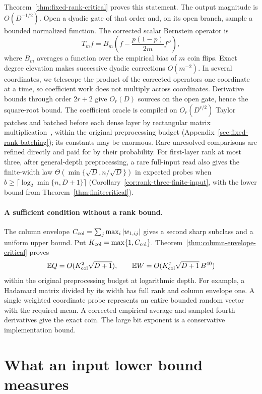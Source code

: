 \documentclass[11pt]{article}
\theoremstyle{definition}
\theoremstyle{remark}
\newcommand{\E}{\mathbb E}
\numberwithin{equation}{section}
\begin{document}
Theorem~\ref{thm:fixed-rank-critical} proves this statement.
The output magnitude is $O(D^{-1/2})$. Open a dyadic gate of
that order and, on its open branch, sample a bounded normalized
function. The corrected scalar Bernstein operator is
\[
 T_m f=B_m\left(f-\frac{p(1-p)}{2m}f''\right),
\]
where $B_m$ averages a function over the empirical bias of $m$
coin flips. Exact degree elevation makes successive dyadic
corrections $O(m^{-2})$. In several coordinates, we telescope the
product of the corrected operators one coordinate at a time, so
coefficient work does not multiply across coordinates. Derivative
bounds through order $2r+2$ give $O_r(D)$ sources on the open gate,
hence the square-root bound. The coefficient oracle is compiled on
$O_r(D^{r/2})$ Taylor patches and batched before each dense layer by
rectangular matrix multiplication~\cite{legall2012rect}, within the
original preprocessing budget (Appendix~\ref{sec:fixed-rank-batching});
its constants may be enormous. Rare unresolved comparisons are refined
directly and paid for by their probability. For
first-layer rank at most three, after general-depth preprocessing,
a rare full-input read also gives the finite-width law
$\Theta(\min\{\sqrt D,n/\sqrt D\})$ in expected
probes when $b\ge\lceil\log_2\min\{n,D+1\}\rceil$
(Corollary~\ref{cor:rank-three-finite-input}, with the lower
bound from Theorem~\ref{thm:finitecritical}).

\paragraph{A sufficient condition without a rank bound.}
The column envelope $C_{\rm col}=\sum_j\max_i|w_{1,ij}|$ gives
a second sharp subclass and a uniform upper bound. Put
$K_{\rm col}=\max\{1,C_{\rm col}\}$.
Theorem~\ref{thm:column-envelope-critical} proves
\[
 \E Q=O(K_{\rm col}^2\sqrt{D+1}),
 \qquad \E W=O(K_{\rm col}^7\sqrt{D+1}\,B^{40})
\]
within the original preprocessing budget at logarithmic depth.
For example, a Hadamard matrix divided by its width has full rank
and column envelope one. A single weighted coordinate probe represents
an entire bounded random vector with the required mean. A corrected
empirical average and sampled fourth derivatives give the exact coin.
The large bit exponent is a conservative implementation bound.


\section{What an input lower bound measures}
\label{sec:lower-main}
\end{document}
